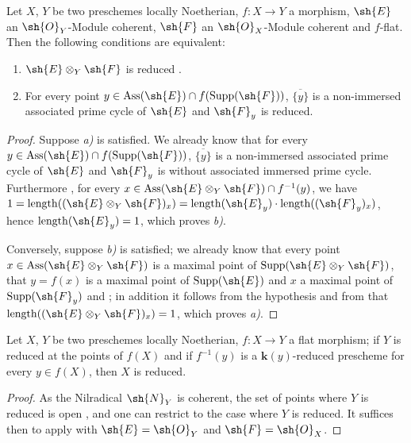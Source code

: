 \begin{proposition}[3.3.4]
\label{IV.3.3.4}
Let $X$, $Y$ be two preschemes locally Noetherian, $f:X\to Y$ a morphism, $\sh{E}$ an $\sh{O}_Y$-Module coherent, $\sh{F}$ an $\sh{O}_X$-Module coherent and $f$-flat.
Then the following conditions are equivalent:
\begin{enumerate}[label=\emph{\alph*)}]
  \item $\sh{E}\otimes_Y\sh{F}$ is reduced .
  \item For every point $y\in\operatorname{Ass}(\sh{E})\cap f(\operatorname{Supp}(\sh{F}))$, $\overline{\{y\}}$ is a non-immersed associated prime cycle of $\sh{E}$ and $\sh{F}_y$ is reduced.
\end{enumerate}
\end{proposition}

\begin{proof}
Suppose \emph{a)} is satisfied.
We already know  that for every $y\in\operatorname{Ass}(\sh{E})\cap f(\operatorname{Supp}(\sh{F}))$, $\overline{\{y\}}$ is a non-immersed associated prime cycle of $\sh{E}$ and $\sh{F}_y$ is without associated immersed prime cycle.
Furthermore , for every $x\in\operatorname{Ass}(\sh{E}\otimes_Y\sh{F})\cap f^{-1}(y)$, we have $1=\operatorname{length}((\sh{E}\otimes_Y\sh{F})_x)=\operatorname{length}(\sh{E}_y)\cdot\operatorname{length}((\sh{F}_y)_x)$, hence $\operatorname{length}(\sh{E}_y)=1$, which proves \emph{b)}.

Conversely, suppose \emph{b)} is satisfied; we already know that every point $x\in\operatorname{Ass}(\sh{E}\otimes_Y\sh{F})$ is a maximal point of $\operatorname{Supp}(\sh{E}\otimes_Y\sh{F})$, that $y=f(x)$ is a maximal point of $\operatorname{Supp}(\sh{E})$ and $x$ a maximal point of $\operatorname{Supp}(\sh{F}_y)$  and ; in addition it follows from the hypothesis and from  that $\operatorname{length}((\sh{E}\otimes_Y\sh{F})_x)=1$, which proves \emph{a)}.
\end{proof}

\begin{corollary}[3.3.5]
\label{IV.3.3.5}
Let $X$, $Y$ be two preschemes locally Noetherian, $f:X\to Y$ a flat morphism; if $Y$ is reduced at the points of $f(X)$ and if $f^{-1}(y)$ is a $\boldsymbol{k}(y)$-reduced prescheme for every $y\in f(X)$, then $X$ is reduced.
\end{corollary}

\begin{proof}
As the Nilradical $\sh{N}_Y$ is coherent, the set of points where $Y$ is reduced is open , and one can restrict to the case where $Y$ is reduced.
It suffices then to apply  with $\sh{E}=\sh{O}_Y$ and $\sh{F}=\sh{O}_X$.
\end{proof}

